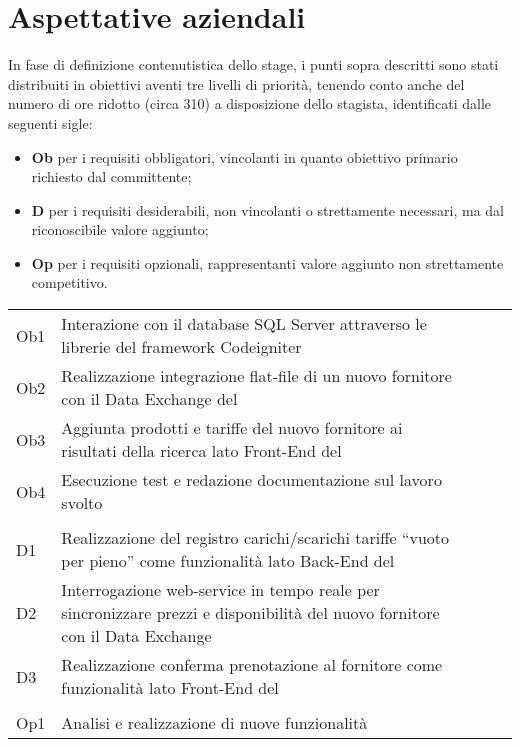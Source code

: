 \section{Aspettative aziendali}
In fase di definizione contenutistica dello stage, i punti sopra descritti sono stati distribuiti in obiettivi aventi tre livelli di priorità, tenendo conto anche del numero di ore ridotto (circa 310) a disposizione dello stagista, identificati dalle seguenti sigle:
\begin{itemize}
	\item \textbf{Ob} per i requisiti obbligatori, vincolanti in quanto obiettivo primario richiesto dal committente;
	\item \textbf{D} per i requisiti desiderabili, non vincolanti o strettamente necessari, ma dal riconoscibile valore aggiunto;
	\item \textbf{Op} per i requisiti opzionali, rappresentanti valore aggiunto non strettamente competitivo.
\end{itemize}

\begin{longtable}{
		@{}
		>{\raggedright}p{.5cm}
		p{10.5cm}
		>{\raggedleft}p{0.2cm}@{}
		>{\raggedright}p{0.2cm}
		p{8.5cm}
		@{}} 
	\hline
	\multicolumn{2}{|c|}{\textbf{Obbligatori}}\\
	\hline
	Ob1 & Interazione con il database SQL Server attraverso le librerie del framework Codeigniter\\
	\hline
	Ob2 & Realizzazione integrazione flat-file di un nuovo fornitore con il Data Exchange del \bookingEngine\\
	\hline
	Ob3 & Aggiunta prodotti e tariffe del nuovo fornitore ai risultati della ricerca lato Front-End del \bookingEngine\\
	\hline
	Ob4 & Esecuzione test e redazione documentazione sul lavoro svolto\\
	\hline
	\multicolumn{2}{|c|}{\textbf{Desiderabili}}\\
	\hline
	D1 & Realizzazione del registro carichi/scarichi tariffe “vuoto per pieno” come	funzionalità lato Back-End del \bookingEngine\\
	\hline
	D2 & Interrogazione web-service in tempo reale per sincronizzare prezzi e disponibilità del nuovo fornitore con il Data Exchange\\
	\hline
	D3 & Realizzazione conferma prenotazione al fornitore come funzionalità lato Front-End del \bookingEngine\\
	\hline
	\multicolumn{2}{|c|}{\textbf{Opzionali}}\\
	\hline
	Op1 & Analisi e realizzazione di nuove funzionalità\\
	\hline
\end{longtable}

